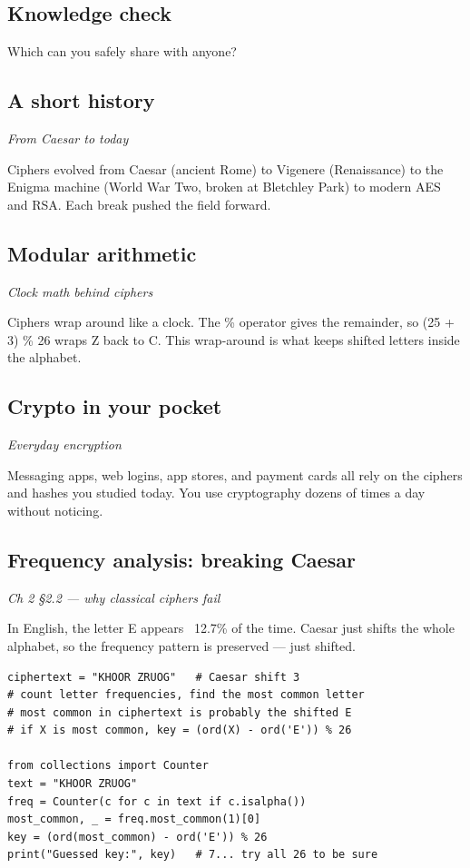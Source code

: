 \documentclass[12pt,openany]{book}
\begin{document}
\medskip

\subsection*{Knowledge check}

Which can you safely share with anyone?

\medskip

\subsection*{A short history}
{\small\itshape\color{gray}From Caesar to today}


Ciphers evolved from Caesar (ancient Rome) to Vigenere (Renaissance) to the Enigma machine (World War Two, broken at Bletchley Park) to modern AES and RSA. Each break pushed the field forward.

\medskip

\subsection*{Modular arithmetic}
{\small\itshape\color{gray}Clock math behind ciphers}


Ciphers wrap around like a clock. The \% operator gives the remainder, so (25 + 3) \% 26 wraps Z back to C. This wrap-around is what keeps shifted letters inside the alphabet.

\medskip

\subsection*{Crypto in your pocket}
{\small\itshape\color{gray}Everyday encryption}


Messaging apps, web logins, app stores, and payment cards all rely on the ciphers and hashes you studied today. You use cryptography dozens of times a day without noticing.

\medskip

\subsection*{Frequency analysis: breaking Caesar}
{\small\itshape\color{gray}Ch 2 §2.2 --- why classical ciphers fail}

In English, the letter E appears ~12.7\% of the time. Caesar just shifts the whole alphabet, so the frequency pattern is preserved --- just shifted.


\begin{lstlisting}
ciphertext = "KHOOR ZRUOG"   # Caesar shift 3
# count letter frequencies, find the most common letter
# most common in ciphertext is probably the shifted E
# if X is most common, key = (ord(X) - ord('E')) % 26

from collections import Counter
text = "KHOOR ZRUOG"
freq = Counter(c for c in text if c.isalpha())
most_common, _ = freq.most_common(1)[0]
key = (ord(most_common) - ord('E')) % 26
print("Guessed key:", key)   # 7... try all 26 to be sure\end{lstlisting}
\end{document}
